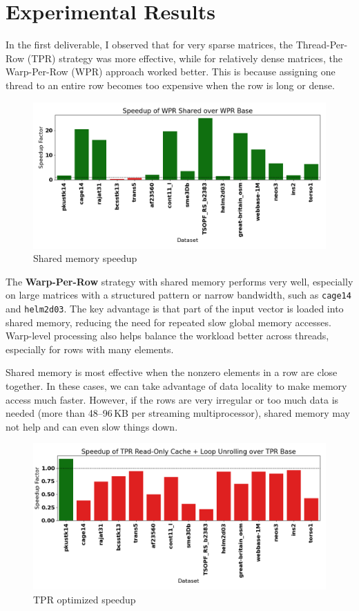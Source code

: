 \documentclass[conference]{IEEEtran}
\begin{document}
\section{Experimental Results}


In the first deliverable, I observed that for very sparse matrices, the Thread-Per-Row (TPR) strategy was more effective, while for relatively dense matrices, the Warp-Per-Row (WPR) approach worked better. This is because assigning one thread to an entire row becomes too expensive when the row is long or dense.

\begin{figure}[ht]
    \centering
    \includegraphics[width=0.95\linewidth]{speedup.png}
    \caption{Shared memory speedup}
    \label{fig:wpr_shared_speedup}
\end{figure}

The \textbf{Warp-Per-Row} strategy with shared memory performs very well, especially on large matrices with a structured pattern or narrow bandwidth, such as \texttt{cage14} and \texttt{helm2d03}. The key advantage is that part of the input vector is loaded into shared memory, reducing the need for repeated slow global memory accesses. Warp-level processing also helps balance the workload better across threads, especially for rows with many elements.

Shared memory is most effective when the nonzero elements in a row are close together. In these cases, we can take advantage of data locality to make memory access much faster. However, if the rows are very irregular or too much data is needed (more than 48--96\,KB per streaming multiprocessor), shared memory may not help and can even slow things down.




\begin{figure}[ht]
    \centering
    \includegraphics[width=0.95\linewidth]{speedupTPR.png}
    \caption{TPR optimized speedup}
    \label{fig:tpr_loop_speedup}
\end{figure}
\end{document}
